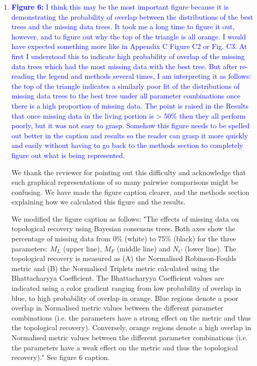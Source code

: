 \documentclass[12pt,letterpaper]{article}
\begin{document}
\begin{enumerate}
\item{\textcolor{blue}{\textbf{Figure 6:} I think this may be the most important figure because it is demonstrating the probability of overlap between the distributions of the best trees and the missing data trees.
It took me a long time to figure it out, however, and to figure out why the top of the triangle is all orange.
I would have expected something more like in Appendix C Figure C2 or Fig. C3.
At first I understood this to indicate high probability of overlap of the missing data trees which had the most missing data with the best tree.
But after re-reading the legend and methods several times, I am interpreting it as follows: the top of the triangle indicates a similarly poor fit of the distributions of missing data trees to the best tree under all parameter combinations once there is a high proportion of missing data.
The point is raised in the Results that once missing data in the living portion is > 50\% then they all perform poorly, but it was not easy to grasp.
Somehow this figure needs to be spelled out better in the caption and results so the reader can grasp it more quickly and easily without having to go back to the methods section to completely figure out what is being represented.}}

We thank the reviewer for pointing out this difficulty and acknowledge that such graphical representations of so many pairwise comparisons might be confusing.
We have made the figure caption clearer, and the methods section explaining how we calculated this figure and the results.

We modified the figure caption as follows:
"The effects of missing data on topological recovery using Bayesian consensus trees. Both axes show the percentage of missing data from 0\% (white) to 75\% (black) for the three parameters: $M_{L}$ (upper line), $M_{F}$ (middle line) and $N_{C}$ (lower line). The topological recovery is measured as (A) the Normalised Robinson-Foulds metric and (B) the Normalised Triplets metric calculated using the Bhattacharyya Coefficient. The Bhattacharyya Coefficient values are indicated using a color gradient ranging from low probability of overlap in blue, to high probability of overlap in orange. Blue regions denote a poor overlap in Normalised metric values between the different parameter combinations (i.e. the parameters have a strong effect on the metric and thus the topological recovery). Conversely, orange regions denote a high overlap in Normalised metric values between the different parameter combinations (i.e. the parameters have a weak effect on the metric and thus the topological recovery)." See figure 6 caption.


\end{enumerate}
\end{document}
